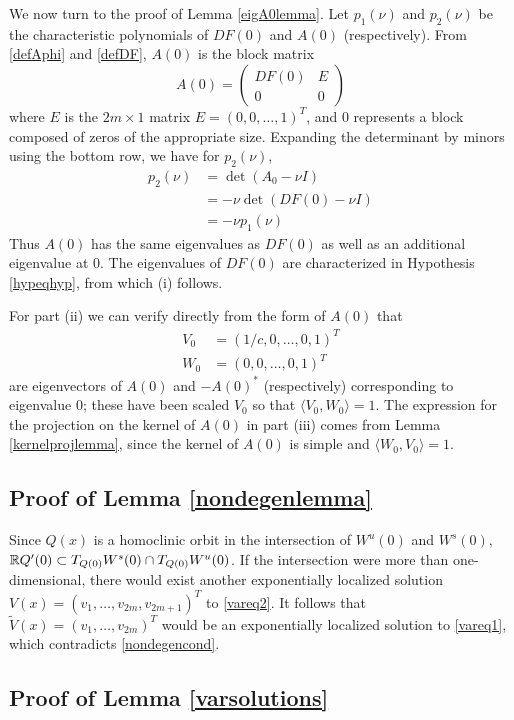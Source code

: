 \documentclass[thesis.tex]{subfiles}
\begin{document}
We now turn to the proof of Lemma \ref{eigA0lemma}. Let $p_1(\nu)$ and $p_2(\nu)$ be the characteristic polynomials of $DF(0)$ and $A(0)$ (respectively). From \eqref{defAphi} and \eqref{defDF}, $A(0)$ is the block matrix
\[
A(0) = \begin{pmatrix}
DF(0) & E \\
0 & 0
\end{pmatrix}
\]
where $E$ is the $2m \times 1$ matrix $E = (0, 0, \dots, 1)^T$, and $0$ represents a block composed of zeros of the appropriate size. Expanding the determinant by minors using the bottom row, we have for $p_2(\nu)$,
\begin{align*}
p_2(\nu) &= \det(A_0 - \nu I) \\
&= -\nu \det(DF(0) - \nu I) \\
&= -\nu p_1(\nu)
\end{align*}
Thus $A(0)$ has the same eigenvalues as $DF(0)$ as well as an additional eigenvalue at 0. The eigenvalues of $DF(0)$ are characterized in Hypothesis \ref{hypeqhyp}, from which (i) follows.

For part (ii) we can verify directly from the form of $A(0)$ that 
\begin{align*}
V_0 &= (1/c, 0, \dots, 0, 1)^T \\
W_0 &= (0, 0, \dots, 0, 1)^T
\end{align*}
are eigenvectors of $A(0)$ and $-A(0)^*$ (respectively) corresponding to eigenvalue 0; these have been scaled $V_0$ so that $\langle V_0, W_0 \rangle = 1$. The expression for the projection on the kernel of $A(0)$ in part (iii) comes from Lemma \ref{kernelprojlemma}, since the kernel of $A(0)$ is simple and $\langle W_0, V_0 \rangle = 1$.

\subsection{Proof of Lemma \ref{nondegenlemma}}
Since $Q(x)$ is a homoclinic orbit in the intersection of $W^u(0)$ and $W^s(0)$, $\mathbb{R} Q'(0) \subset T_{Q(0)}W^s(0) \cap T_{Q(0)}W^u(0)$. If the intersection were more than one-dimensional, there would exist another exponentially localized solution $V(x) = (v_1, \dots, v_{2m}, v_{2m+1})^T$ to \eqref{vareq2}. It follows that $\tilde{V}(x) = (v_1, \dots, v_{2m})^T$ would be an exponentially localized solution to \eqref{vareq1}, which contradicts \eqref{nondegencond}.

\subsection{Proof of Lemma \ref{varsolutions}}
\end{document}

